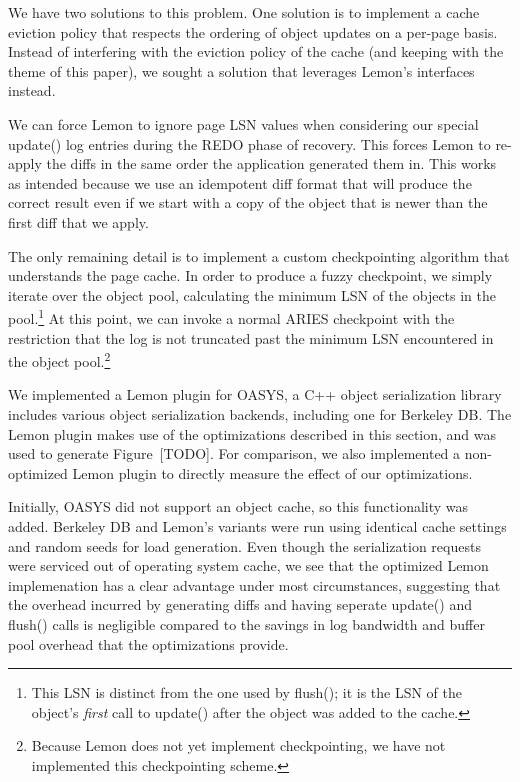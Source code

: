 \documentclass[letterpaper,twocolumn,english]{article}
\newcommand{\yad}{Lemon\xspace}
\begin{document}
We have two solutions to this problem.  One solution is to
implement a cache eviction policy that respects the ordering of object
updates on a per-page basis.  Instead of interfering with the eviction policy
of the cache (and keeping with the theme of this paper), we sought a
solution that leverages \yad's interfaces instead.

We can force \yad to ignore page LSN values when considering our
special update() log entries during the REDO phase of recovery.  This
forces \yad to re-apply the diffs in the same order the application
generated them in.  This works as intended because we use an
idempotent diff format that will produce the correct result even if we
start with a copy of the object that is newer than the first diff that
we apply.

The only remaining detail is to implement a custom checkpointing
algorithm that understands the page cache.  In order to produce a
fuzzy checkpoint, we simply iterate over the object pool, calculating
the minimum LSN of the objects in the pool.\footnote{This LSN is distinct from
the one used by flush(); it is the LSN of the object's {\em first}
call to update() after the object was added to the cache.}  At this
point, we can invoke a normal ARIES checkpoint with the restriction
that the log is not truncated past the minimum LSN encountered in the
object pool.\footnote{Because \yad does not yet implement
checkpointing, we have not implemented this checkpointing scheme.}

We implemented a \yad plugin for OASYS, a C++ object serialization
library includes various object serialization backends, including one
for Berkeley DB.  The \yad plugin makes use of the optimizations
described in this section, and was used to generate Figure~[TODO].
For comparison, we also implemented a non-optimized \yad plugin to
directly measure the effect of our optimizations.

Initially, OASYS did not support an object cache, so this
functionality was added.  Berkeley DB and \yad's variants were run
using identical cache settings and random seeds for load generation.
Even though the serialization requests were serviced out of operating
system cache, we see that the optimized \yad implemenation has a
clear advantage under most circumstances, suggesting that the overhead
incurred by generating diffs and having seperate update() and flush()
calls is negligible compared to the savings in log bandwidth and
buffer pool overhead that the optimizations provide.
\end{document}
